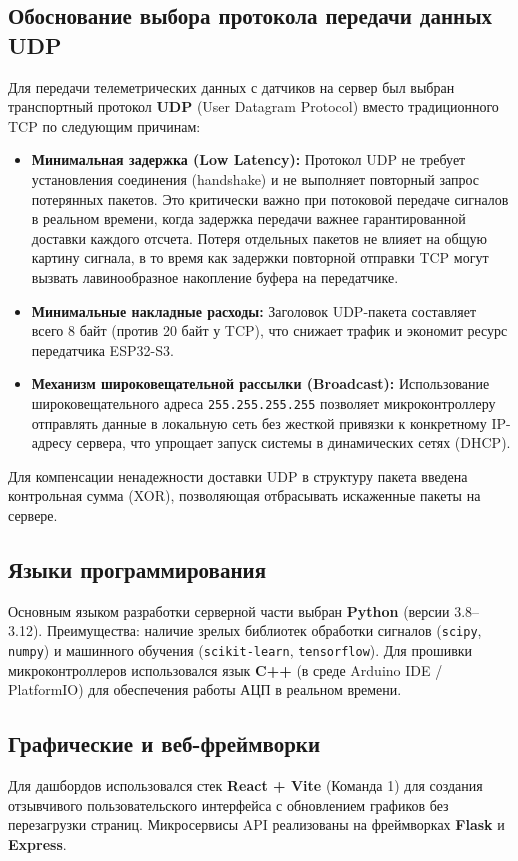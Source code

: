 \documentclass[utf8, russian]{eskdtext}
\begin{document}
\subsection{Обоснование выбора протокола передачи данных UDP}
Для передачи телеметрических данных с датчиков на сервер был выбран транспортный протокол \textbf{UDP} (User Datagram Protocol) вместо традиционного TCP по следующим причинам:
\begin{itemize}
    \item \textbf{Минимальная задержка (Low Latency):} Протокол UDP не требует установления соединения (handshake) и не выполняет повторный запрос потерянных пакетов. Это критически важно при потоковой передаче сигналов в реальном времени, когда задержка передачи важнее гарантированной доставки каждого отсчета. Потеря отдельных пакетов не влияет на общую картину сигнала, в то время как задержки повторной отправки TCP могут вызвать лавинообразное накопление буфера на передатчике.
    \item \textbf{Минимальные накладные расходы:} Заголовок UDP-пакета составляет всего 8 байт (против 20 байт у TCP), что снижает трафик и экономит ресурс передатчика ESP32-S3.
    \item \textbf{Механизм широковещательной рассылки (Broadcast):} Использование широковещательного адреса \texttt{255.255.255.255} позволяет микроконтроллеру отправлять данные в локальную сеть без жесткой привязки к конкретному IP-адресу сервера, что упрощает запуск системы в динамических сетях (DHCP).
\end{itemize}
Для компенсации ненадежности доставки UDP в структуру пакета введена контрольная сумма (XOR), позволяющая отбрасывать искаженные пакеты на сервере.

\subsection{Языки программирования}
Основным языком разработки серверной части выбран \textbf{Python} (версии 3.8–3.12). Преимущества: наличие зрелых библиотек обработки сигналов (\texttt{scipy}, \texttt{numpy}) и машинного обучения (\texttt{scikit-learn}, \texttt{tensorflow}). Для прошивки микроконтроллеров использовался язык \textbf{C++} (в среде Arduino IDE / PlatformIO) для обеспечения работы АЦП в реальном времени.

\subsection{Графические и веб-фреймворки}
Для дашбордов использовался стек \textbf{React + Vite} (Команда 1) для создания отзывчивого пользовательского интерфейса с обновлением графиков без перезагрузки страниц. Микросервисы API реализованы на фреймворках \textbf{Flask} и \textbf{Express}.
\end{document}
